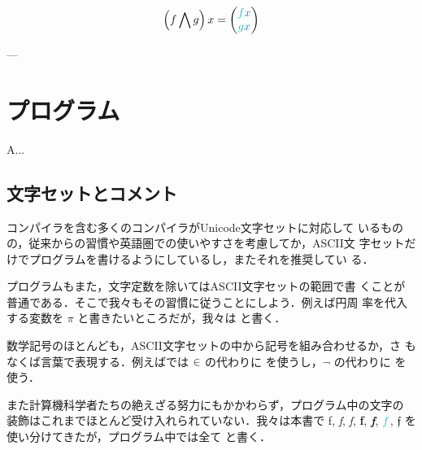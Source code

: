 \documentclass[a5paper,twoside,fleqn,draft]{jsbook}
\begin{document}
\begin{equation}
  \left(f\bigwedge g\right)x=\hPairWith{\hFunc{f}\hVar{x}}{\hFunc{g}\hVar{x}}
\end{equation}

---




\chapter{プログラム}
\label{ch:program}

\begin{leader}
A...
\end{leader}

\section{文字セットとコメント}

\haskell コンパイラを含む多くのコンパイラがUnicode文字セットに対応して
いるものの，従来からの習慣や英語圏での使いやすさを考慮してか，ASCII文
字セットだけでプログラムを書けるようにしているし，またそれを推奨してい
る．

\haskell プログラムもまた，文字定数を除いてはASCII文字セットの範囲で書
くことが普通である．そこで我々もその習慣に従うことにしよう．例えば円周
率を代入する変数を $\pi$ と書きたいところだが，我々は  と書く．

数学記号のほとんども，ASCII文字セットの中から記号を組み合わせるか，さ
もなくば言葉で表現する．例えば\haskell では $\operatorname{\in}$ の代わりに
\code{<-} を使うし，$\neg$ の代わりに  を使う．

また計算機科学者たちの絶えざる努力にもかかわらず，プログラム中の文字の
装飾はこれまでほとんど受け入れられていない．我々は本書で \textrm{f},
\textit{f}, \textsl{f}, \textbf{f}, \textbf{\textit{f}}, $\hFunc{f}$,
$\mathfrak{f}$ を使い分けてきたが，\haskell プログラム中では全て
 と書く．
\end{document}

